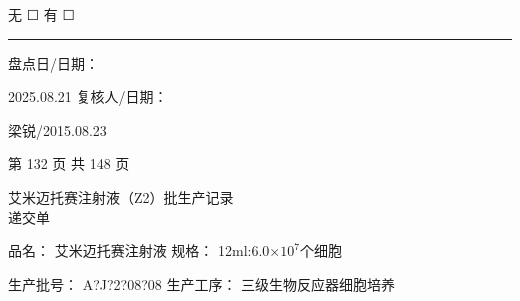 \documentclass[UTF8,10pt,a4paper,fontset=fandol]{ctexart}
\newcommand{\fieldvalue}[1]{#1}
\newcommand{\handwritten}[1]{#1}
\newcommand{\checkboxfield}[1]{\ifstrequal{#1}{checked}{☑}{\ifstrequal{#1}{unclear}{?}{☐}}}
\begin{document}
无
\fieldvalue{\checkboxfield{unchecked}}
\quad
有
\fieldvalue{\checkboxfield{unchecked}}
\hspace{4em}\rule{6em}{0.4pt}

\vspace{0.8em}

\noindent
盘点日/日期：

\fieldvalue{\handwritten{2025.08.21}}
\hfill
复核人/日期：

\fieldvalue{\handwritten{梁锐/2015.08.23}}

\vfill

\begin{center}
第 132 页 共 148 页
\end{center}

\newpage

\begin{center}
{\Large 艾米迈托赛注射液（Z2）批生产记录}\\[0.5em]
递交单
\end{center}

\noindent
品名：%
\fieldvalue{艾米迈托赛注射液}
\hfill
规格：%
\fieldvalue{12ml:6.0$\times 10^{7}$个细胞}

\noindent
生产批号：%
\fieldvalue{\handwritten{A?J?2?08?08}}
\hfill
生产工序：%
\fieldvalue{三级生物反应器细胞培养}

\medskip
\end{document}
